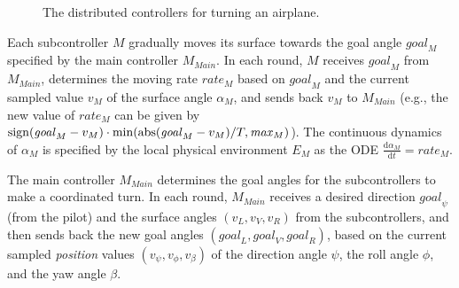 \begin{figure}
\caption{The distributed controllers for turning an airplane.} \label{fig:airplane-ctrl}
\end{figure}


Each subcontroller $M$ gradually moves its surface towards the goal
angle $\mathit{goal}_M$ specified by the main controller
$M_\mathit{Main}$. 
In each round, $M$ receives $\mathit{goal}_M$ from $M_\mathit{Main}$,
determines the moving rate $\mathit{rate}_M$ based on $\mathit{goal}_M$ 
and the current sampled value $v_M$ of the surface angle $\alpha_M$,
and sends back $v_M$ to $M_\mathit{Main}$
(e.g., the new value of $\mathit{rate}_M$ can be given by
$ \mathrm{sign}(\mathit{goal}_M - v_M) \cdot \min(\mathrm{abs}(\mathit{goal}_M - v_M) / T, \mathit{max}_M)$).
The continuous dynamics of $\alpha_M$ is specified 
by the local physical environment $E_M$
as the ODE $\frac{\mathrm{d}\alpha_M}{\mathrm{d}t} = \mathit{rate}_M$.

The main controller $M_\mathit{Main}$ determines the goal angles for the subcontrollers to make a coordinated turn.
In  each round, $M_\mathit{Main}$ receives a  desired direction $\mathit{goal}_\psi$ %
(from the pilot)
and the surface angles $(v_L, v_V, v_R)$ from the subcontrollers, 
and then sends back the new goal angles $(\mathit{goal}_L,\mathit{goal}_V,\mathit{goal}_R)$,
based on the current sampled \emph{position} values $(v_\psi, v_\phi, v_\beta)$ 
of  the direction angle $\psi$, the roll angle $\phi$, and the yaw angle $\beta$.


